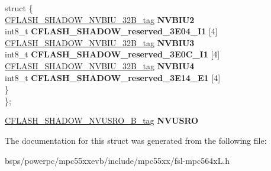\begin{DoxyCompactItemize}
\begin{tabbing}
\mbox{\label{unionCFLASH__SHADOW__struct__tag_1_1_0D1481_a6960626a86ed8054181517560fc83ca6}} 
\>struct \{\\
\>\>\mbox{\hyperlink{unionCFLASH__SHADOW__NVBIU__32B__tag}{CFLASH\_SHADOW\_NVBIU\_32B\_tag}} {\bfseries NVBIU2}\\
\>\>int8\_t {\bfseries CFLASH\_SHADOW\_reserved\_3E04\_I1} \mbox{[}4\mbox{]}\\
\>\>\mbox{\hyperlink{unionCFLASH__SHADOW__NVBIU__32B__tag}{CFLASH\_SHADOW\_NVBIU\_32B\_tag}} {\bfseries NVBIU3}\\
\>\>int8\_t {\bfseries CFLASH\_SHADOW\_reserved\_3E0C\_I1} \mbox{[}4\mbox{]}\\
\>\>\mbox{\hyperlink{unionCFLASH__SHADOW__NVBIU__32B__tag}{CFLASH\_SHADOW\_NVBIU\_32B\_tag}} {\bfseries NVBIU4}\\
\>\>int8\_t {\bfseries CFLASH\_SHADOW\_reserved\_3E14\_E1} \mbox{[}4\mbox{]}\\
\>\} \\
\}; \\

\end{tabbing}\item 
\mbox{\label{structCFLASH__SHADOW__struct__tag_acc421026de1f41825a1c2c362eb3407a}} 
\mbox{\hyperlink{unionCFLASH__SHADOW__NVUSRO__32B__tag}{C\+F\+L\+A\+S\+H\+\_\+\+S\+H\+A\+D\+O\+W\+\_\+\+N\+V\+U\+S\+R\+O\+\_\+B\+\_\+tag}} {\bfseries N\+V\+U\+S\+RO}
\end{DoxyCompactItemize}


The documentation for this struct was generated from the following file\+:\begin{DoxyCompactItemize}
\item 
bsps/powerpc/mpc55xxevb/include/mpc55xx/fsl-\/mpc564x\+L.\+h\end{DoxyCompactItemize}

